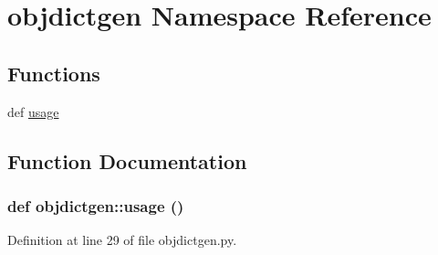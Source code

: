 \hypertarget{namespaceobjdictgen}{
\section{objdictgen Namespace Reference}
\label{namespaceobjdictgen}
}


\subsection*{Functions}
\begin{CompactItemize}
\item 
def \hyperlink{namespaceobjdictgen_3d57328d6ceb6d14e3af839dae1fe19e}{usage}
\end{CompactItemize}


\subsection{Function Documentation}
\hypertarget{namespaceobjdictgen_3d57328d6ceb6d14e3af839dae1fe19e}{
\subsubsection[usage]{\setlength{\rightskip}{0pt plus 5cm}def objdictgen::usage ()}}
\label{namespaceobjdictgen_3d57328d6ceb6d14e3af839dae1fe19e}




Definition at line 29 of file objdictgen.py.